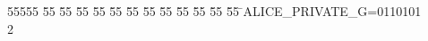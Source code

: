 %
%
\begin{tabbing}
55555 \= 55 \= 55 \= 55 \= 55 \= 55 \= 55 \= 55 \= 55 \= 55 \= 55 \= 55 \= 55 \= \>ALICE\_PRIVATE\_G=0110101\\[0pt]
2\>\end{tabbing}
